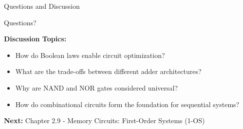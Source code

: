 \documentclass[aspectratio=169,11pt]{beamer}
\begin{document}
\begin{frame}{Questions and Discussion}
\begin{center}
\Large
Questions?

\vspace{1cm}

\normalsize
\textbf{Discussion Topics:}
\begin{itemize}
\item How do Boolean laws enable circuit optimization?
\item What are the trade-offs between different adder architectures?
\item Why are NAND and NOR gates considered universal?
\item How do combinational circuits form the foundation for sequential systems?
\end{itemize}

\vspace{0.5cm}
\textbf{Next:} Chapter 2.9 - Memory Circuits: First-Order Systems (1-OS)
\end{center}
\end{frame}
\end{document}
